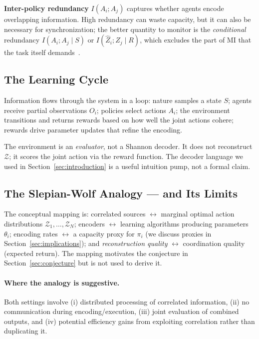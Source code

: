 \documentclass[10pt, letterpaper]{article}
\begin{document}
\textbf{Inter-policy redundancy} $I(A_i; A_j)$ captures whether agents encode overlapping information. High redundancy can waste capacity, but it can also be necessary for synchronization; the better quantity to monitor is the \emph{conditional} redundancy $I(A_i; A_j \mid S)$ or $I(\hat{Z}_i; \hat{Z}_j \mid R)$, which excludes the part of MI that the task itself demands~\cite{li2022pmic,fischer2020ceb}.

\subsection{The Learning Cycle}

Information flows through the system in a loop: nature samples a state $S$; agents receive partial observations $O_i$; policies select actions $A_i$; the environment transitions and returns rewards based on how well the joint actions cohere; rewards drive parameter updates that refine the encoding.

The environment is an \emph{evaluator}, not a Shannon decoder. It does not reconstruct $\mathcal{Z}$; it scores the joint action via the reward function. The decoder language we used in Section~\ref{sec:introduction} is a useful intuition pump, not a formal claim.

\subsection{The Slepian-Wolf Analogy --- and Its Limits}
\label{sec:sw-analogy}

The conceptual mapping is: correlated sources $\leftrightarrow$ marginal optimal action distributions $\mathcal{Z}_1, \ldots, \mathcal{Z}_N$; encoders $\leftrightarrow$ learning algorithms producing parameters $\theta_i$; encoding rates $\leftrightarrow$ a capacity proxy for $\pi_i$ (we discuss proxies in Section~\ref{sec:implications}); and \emph{reconstruction quality} $\leftrightarrow$ coordination quality (expected return). The mapping motivates the conjecture in Section~\ref{sec:conjecture} but is not used to derive it.

\paragraph{Where the analogy is suggestive.} Both settings involve (i) distributed processing of correlated information, (ii) no communication during encoding/execution, (iii) joint evaluation of combined outputs, and (iv) potential efficiency gains from exploiting correlation rather than duplicating it.
\end{document}
